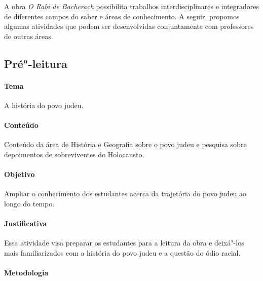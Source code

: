 \documentclass[12pt]{extarticle}
\begin{document}
A obra \emph{O Rabi de Bacherach} possibilita trabalhos
interdisciplinares e integradores de diferentes campos do saber e áreas
de conhecimento. A seguir, propomos algumas atividades que podem ser
desenvolvidas conjuntamente com professores de outras áreas. 

\begin{comment}Além das
habilidades de Linguagens e suas Tecnologias e de Língua Portuguesa,
indicadas nas etapas da seção anterior e válidas também para esta,
listamos a seguir as habilidades de outras áreas, presentes na abordagem
interdisciplinar:
\end{comment}

\subsection{Pré"-leitura}

\paragraph{Tema} A história do povo judeu.

\paragraph{Conteúdo} Conteúdo da área de História e Geografia sobre o povo judeu
e pesquisa sobre depoimentos de sobreviventes do Holocausto.

\paragraph{Objetivo} Ampliar o conhecimento dos estudantes acerca da trajetória
do povo judeu ao longo do tempo.

\paragraph{Justificativa} Essa atividade visa preparar os estudantes para
a leitura da obra e deixá"-los mais familiarizados com a história do povo 
judeu e a questão do ódio racial.

\paragraph{Metodologia}
\end{document}
